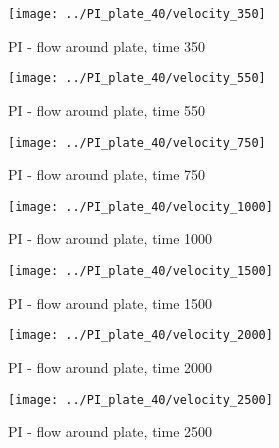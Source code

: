 \begin{figure}[htbp]
 \centering 
 \texttt{[image: ../PI\_plate\_40/velocity\_350]}
 \label{transitions}
 \caption{PI - flow around plate, time 350}
\end{figure}

\begin{figure}[htbp]
 \centering 
 \texttt{[image: ../PI\_plate\_40/velocity\_550]}
 \label{transitions}
 \caption{PI - flow around plate, time 550}
\end{figure}

\begin{figure}[htbp]
 \centering 
 \texttt{[image: ../PI\_plate\_40/velocity\_750]}
 \label{transitions}
 \caption{PI - flow around plate, time 750}
\end{figure}

\begin{figure}[htbp]
 \centering 
 \texttt{[image: ../PI\_plate\_40/velocity\_1000]}
 \label{transitions}
 \caption{PI - flow around plate, time 1000}
\end{figure}

\begin{figure}[htbp]
 \centering 
 \texttt{[image: ../PI\_plate\_40/velocity\_1500]}
 \label{transitions}
 \caption{PI - flow around plate, time 1500}
\end{figure}

\begin{figure}[htbp]
 \centering 
 \texttt{[image: ../PI\_plate\_40/velocity\_2000]}
 \caption{PI - flow around plate, time 2000}
\end{figure}

\begin{figure}[htbp]
 \centering 
 \texttt{[image: ../PI\_plate\_40/velocity\_2500]}
 \caption{PI - flow around plate, time 2500}
\end{figure}
